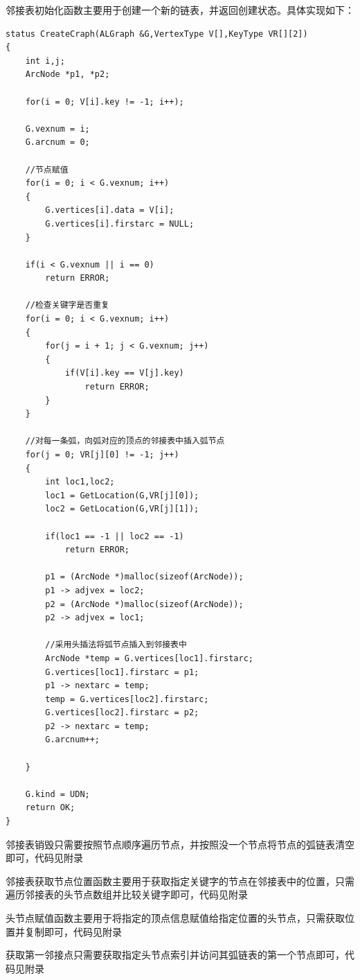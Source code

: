 \documentclass[supercite]{Experimental_Report}
\theoremstyle{definition}
\begin{document}
	邻接表初始化函数主要用于创建一个新的链表，并返回创建状态。具体实现如下：
\begin{lstlisting}[caption={邻接表初始化}, label=lst:create_adjacency_list]
status CreateCraph(ALGraph &G,VertexType V[],KeyType VR[][2])
{
	int i,j;
	ArcNode *p1, *p2;

	for(i = 0; V[i].key != -1; i++);

	G.vexnum = i;
	G.arcnum = 0;

	//节点赋值
	for(i = 0; i < G.vexnum; i++)
	{
		G.vertices[i].data = V[i];
		G.vertices[i].firstarc = NULL;
	}

	if(i < G.vexnum || i == 0)
		return ERROR;

	//检查关键字是否重复
	for(i = 0; i < G.vexnum; i++)
	{
		for(j = i + 1; j < G.vexnum; j++)
		{
			if(V[i].key == V[j].key)
				return ERROR;
		}
	}

	//对每一条弧，向弧对应的顶点的邻接表中插入弧节点
	for(j = 0; VR[j][0] != -1; j++)
	{
		int loc1,loc2;
		loc1 = GetLocation(G,VR[j][0]);
		loc2 = GetLocation(G,VR[j][1]);

		if(loc1 == -1 || loc2 == -1)
			return ERROR;
	
		p1 = (ArcNode *)malloc(sizeof(ArcNode));
		p1 -> adjvex = loc2;
		p2 = (ArcNode *)malloc(sizeof(ArcNode));
		p2 -> adjvex = loc1;

		//采用头插法将弧节点插入到邻接表中
		ArcNode *temp = G.vertices[loc1].firstarc;
		G.vertices[loc1].firstarc = p1;
		p1 -> nextarc = temp;
		temp = G.vertices[loc2].firstarc;
		G.vertices[loc2].firstarc = p2;
		p2 -> nextarc = temp;
		G.arcnum++;
		
	}

	G.kind = UDN;
	return OK;
}
	\end{lstlisting}

	邻接表销毁只需要按照节点顺序遍历节点，并按照没一个节点将节点的弧链表清空即可，代码见附录

	邻接表获取节点位置函数主要用于获取指定关键字的节点在邻接表中的位置，只需遍历邻接表的头节点数组并比较关键字即可，代码见附录

	头节点赋值函数主要用于将指定的顶点信息赋值给指定位置的头节点，只需获取位置并复制即可，代码见附录

	获取第一邻接点只需要获取指定头节点索引并访问其弧链表的第一个节点即可，代码见附录
\end{document}
